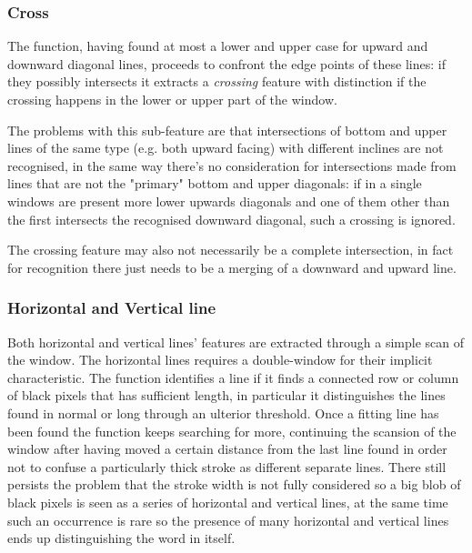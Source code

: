 \subsubsection{Cross}
The function, having found at most a lower and upper case for upward and downward diagonal lines, proceeds to confront the edge points of these lines: if they possibly intersects it extracts a \emph{crossing} feature with distinction if the crossing happens in the lower or upper part of the window. 

The problems with this sub-feature are that intersections of bottom and upper lines of the same type (e.g. both upward facing) with different inclines are not recognised, in the same way there's no consideration for intersections made from lines that are not the "primary" bottom and upper diagonals: if in a single windows are present more lower upwards diagonals and one of them other than the first intersects the recognised downward diagonal, such a crossing is ignored.

The crossing feature may also not necessarily be a complete intersection, in fact for recognition there just needs to be a merging of a downward and upward line. 


\subsubsection{Horizontal and Vertical line}
Both horizontal and vertical lines' features are extracted through
a simple scan of the window.
The horizontal lines requires a double-window for their implicit characteristic.
The function identifies a line if it finds a connected row or column of black pixels that has sufficient length, in particular it distinguishes the lines found in normal or long through an ulterior threshold.
Once a fitting line has been found the function keeps searching for more, continuing the scansion of the window after having moved a certain distance from the last line found in order not to confuse a particularly thick stroke as different separate lines.
There still persists the problem that the stroke width is not fully considered so a big blob of black pixels is seen as a series of horizontal and vertical lines, at the same time such an occurrence is rare so the presence of many horizontal and vertical lines ends up distinguishing the word in itself.     
